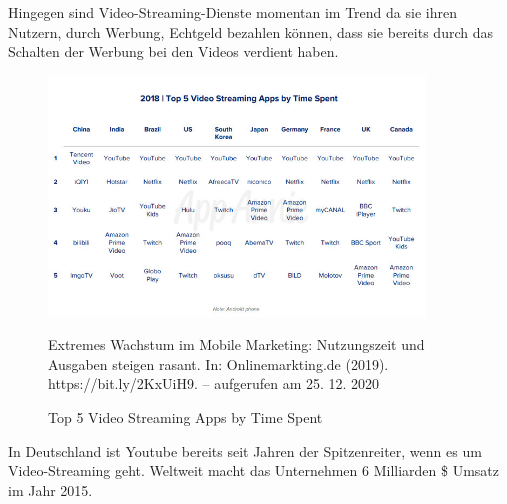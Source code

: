 Hingegen sind Video-Streaming-Dienste momentan im Trend da sie ihren Nutzern, durch Werbung, Echtgeld bezahlen können, dass sie bereits durch das Schalten der Werbung bei den Videos verdient haben.

\begin{figure}[h]
    \begin{center} 
        \includegraphics[width=10cm]{media/4.png}
        \caption{Top 5 Video Streaming Apps by Time Spent}
        \label{stream}
        \bildquelle Extremes Wachstum im Mobile Marketing: Nutzungszeit und Ausgaben steigen rasant. In: Onlinemarkting.de (2019). https://bit.ly/2KxUiH9. – aufgerufen am 25. 12. 2020
    \end{center}
\end{figure}
  
\noindent In Deutschland ist Youtube bereits seit Jahren der Spitzenreiter, wenn es um Video-Streaming geht. Weltweit macht das Unternehmen 6 Milliarden \$ Umsatz im Jahr 2015.
